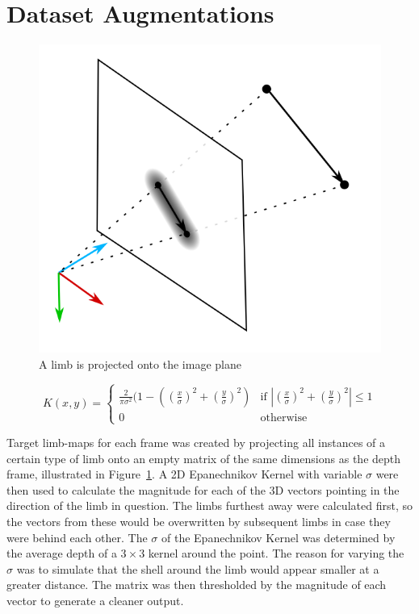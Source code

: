 \section{Dataset Augmentations}

\begin{figure}
  \centering
  \includegraphics[width=.6\textwidth]{img/projection}
  \caption[Projection]{A limb is projected onto the image plane}
  \label{fig:projection}
\end{figure}

\begin{equation}
  \label{eq:epanechnikov}
  K(x, y) =
  \begin{cases}
    \frac{2}{\pi\sigma^{2}}(1 - ((\frac{x}{\sigma})^{2} + (\frac{y}{\sigma})^{2}) & \text{if } |(\frac{x}{\sigma})^{2} + (\frac{y}{\sigma})^{2}| \leq 1\\
    0 & \text{otherwise}
    \end{cases}
\end{equation}

Target limb-maps for each frame was created by projecting all instances of a certain type of limb onto an empty matrix of the same dimensions as the depth frame, illustrated in Figure~\ref{fig:projection}. A 2D Epanechnikov Kernel with variable $\sigma$ were then used to calculate the magnitude for each of the 3D vectors pointing in the direction of the limb in question. The limbs furthest away were calculated first, so the vectors from these would be overwritten by subsequent limbs in case they were behind each other. The $\sigma$ of the Epanechnikov Kernel was determined by the average depth of a $3 \times 3$ kernel around the point. The reason for varying the $\sigma$ was to simulate that the shell around the limb would appear smaller at a greater distance. The matrix was then thresholded by the magnitude of each vector to generate a cleaner output. 

